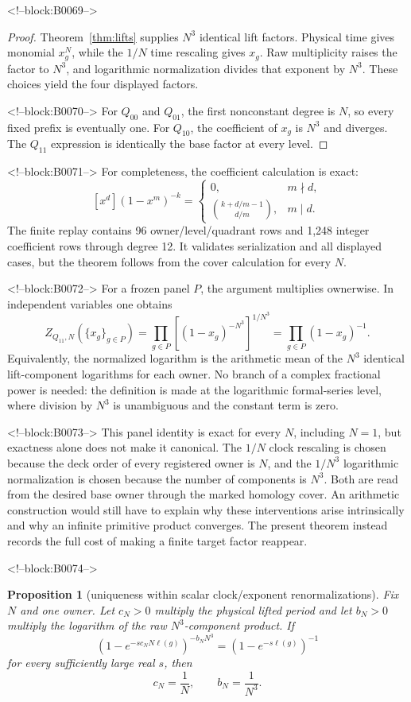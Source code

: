 \documentclass[11pt]{article}
\newtheorem{proposition}[theorem]{Proposition}
\theoremstyle{definition}
\theoremstyle{remark}
\begin{document}
<!--block:B0069-->
\begin{proof}
Theorem~\ref{thm:lifts} supplies $N^3$ identical lift factors. Physical time gives monomial $x_g^N$, while the $1/N$ time rescaling gives $x_g$. Raw multiplicity raises the factor to $N^3$, and logarithmic normalization divides that exponent by $N^3$. These choices yield the four displayed factors.

<!--block:B0070-->
For $Q_{00}$ and $Q_{01}$, the first nonconstant degree is $N$, so every fixed prefix is eventually one. For $Q_{10}$, the coefficient of $x_g$ is $N^3$ and diverges. The $Q_{11}$ expression is identically the base factor at every level.
\end{proof}

<!--block:B0071-->
For completeness, the coefficient calculation is exact:
\[
[x^d](1-x^m)^{-k}=
\begin{cases}
0,&m\nmid d,\\
\binom{k+d/m-1}{d/m},&m\mid d.
\end{cases}
\]
The finite replay contains 96 owner/level/quadrant rows and 1,248 integer coefficient rows through degree 12. It validates serialization and all displayed cases, but the theorem follows from the cover calculation for every $N$.

<!--block:B0072-->
For a frozen panel $P$, the argument multiplies ownerwise. In independent variables one obtains
\[
Z_{Q_{11},N}(\{x_g\}_{g\in P})
=\prod_{g\in P}\left[(1-x_g)^{-N^3}\right]^{1/N^3}
=\prod_{g\in P}(1-x_g)^{-1}.
\]
Equivalently, the normalized logarithm is the arithmetic mean of the $N^3$ identical lift-component logarithms for each owner. No branch of a complex fractional power is needed: the definition is made at the logarithmic formal-series level, where division by $N^3$ is unambiguous and the constant term is zero.

<!--block:B0073-->
This panel identity is exact for every $N$, including $N=1$, but exactness alone does not make it canonical. The $1/N$ clock rescaling is chosen because the deck order of every registered owner is $N$, and the $1/N^3$ logarithmic normalization is chosen because the number of components is $N^3$. Both are read from the desired base owner through the marked homology cover. An arithmetic construction would still have to explain why these interventions arise intrinsically and why an infinite primitive product converges. The present theorem instead records the full cost of making a finite target factor reappear.

<!--block:B0074-->
\begin{proposition}[uniqueness within scalar clock/exponent renormalizations]\label{prop:unique-renorm}
Fix $N$ and one owner. Let $c_N>0$ multiply the physical lifted period and let $b_N>0$ multiply the logarithm of the raw $N^3$-component product. If
\[
\left(1-e^{-s c_NN\ell(g)}\right)^{-b_NN^3}
=\left(1-e^{-s\ell(g)}\right)^{-1}
\]
for every sufficiently large real $s$, then
\[
c_N=\frac1N,
\qquad
b_N=\frac1{N^3}.
\]
\end{proposition}
\end{document}
